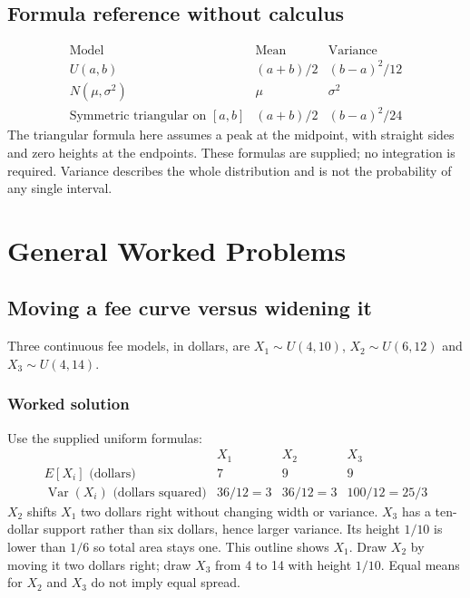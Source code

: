 \subsection{Formula reference without calculus}
\[
\begin{array}{c|cc}
\text{Model}&\text{Mean}&\text{Variance}\\ \hline
U(a,b)&(a+b)/2&(b-a)^2/12\\
N(\mu,\sigma^2)&\mu&\sigma^2\\
\text{Symmetric triangular on }[a,b]&(a+b)/2&(b-a)^2/24
\end{array}
\]
The triangular formula here assumes a peak at the midpoint, with straight sides and zero heights at the endpoints. These formulas are supplied; no integration is required. Variance describes the whole distribution and is not the probability of any single interval.
\section{General Worked Problems}\label{sec:general-worked}

\subsection{Moving a fee curve versus widening it}\label{prob:sec:general-worked0}
Three continuous fee models, in dollars, are $X_1\sim U(4,10)$, $X_2\sim U(6,12)$ and $X_3\sim U(4,14)$.
\subsubsection*{Worked solution}\label{sol:sec:general-worked0}
Use the supplied uniform formulas:
\[
\begin{array}{c|ccc}
&X_1&X_2&X_3\\ \hline
E[X_i]\text{ (dollars)}&7&9&9\\
\operatorname{Var}(X_i)\text{ (dollars squared)}&36/12=3&36/12=3&100/12=25/3
\end{array}
\]
$X_2$ shifts $X_1$ two dollars right without changing width or variance. $X_3$ has a ten-dollar support rather than six dollars, hence larger variance. Its height $1/10$ is lower than $1/6$ so total area stays one.
This outline shows $X_1$. Draw $X_2$ by moving it two dollars right; draw $X_3$ from 4 to 14 with height $1/10$. Equal means for $X_2$ and $X_3$ do not imply equal spread.


